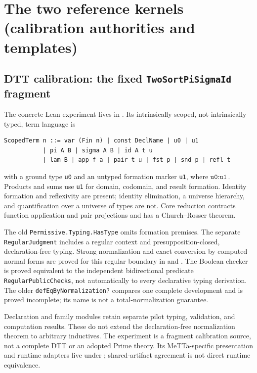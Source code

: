 \documentclass[11pt]{article}
\newcommand{\DTT}{DTT}
\newcommand{\code}[1]{\texttt{#1}}
\begin{document}
\section{The two reference kernels (calibration authorities and templates)}
\label{sec:oracles}

\subsection{\DTT{} calibration: the fixed \code{TwoSortPiSigmaId} fragment}
The concrete Lean experiment lives in
.
Its intrinsically scoped, not intrinsically typed, term language is
\begin{lstlisting}
ScopedTerm n ::= var (Fin n) | const DeclName | u0 | u1
           | pi A B | sigma A B | id A t u
           | lam B | app f a | pair t u | fst p | snd p | refl t
\end{lstlisting}
{\raggedright
with a ground type \code{u0} and an untyped formation marker \code{u1},
where $\code{u0}:\code{u1}$. Products and sums use \code{u1} for domain,
codomain, and result formation. Identity formation and reflexivity are present;
identity elimination, a universe hierarchy, and quantification over a universe
of types are not. Core reduction contracts function application and pair
projections and has a Church--Rosser theorem.

The old \code{Permissive.Typing.HasType} omits formation premises.
The separate \code{RegularJudgment} includes a regular context and
presupposition-closed, declaration-free typing. Strong normalization and exact
conversion by computed normal forms are proved for this regular boundary in
 and .
The Boolean checker is proved equivalent to the independent bidirectional
predicate \code{RegularPublicChecks}, not automatically to every declarative
typing derivation. The older \code{defEqByNormalization?} compares one complete
development and is proved incomplete; its name is not a total-normalization
guarantee.

Declaration and family modules retain separate pilot typing, validation, and
computation results. These do not extend the declaration-free normalization
theorem to arbitrary inductives. The experiment is a fragment calibration
source, not a complete \DTT{} or an adopted Prime theory. Its MeTTa-specific
presentation and runtime adapters live under
; shared-artifact
agreement is not direct runtime equivalence.
\par}
\end{document}
